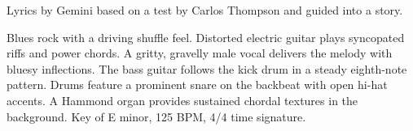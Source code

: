 

\begin{notes}
Lyrics by Gemini based on a test by Carlos Thompson and guided into a story.
\end{notes}
\begin{style}
Blues rock with a driving shuffle feel. %
Distorted electric guitar plays syncopated riffs and power chords. %
A gritty, gravelly male vocal delivers the melody with bluesy inflections. %
The bass guitar follows the kick drum in a steady eighth-note pattern. %
Drums feature a prominent snare on the backbeat with open hi-hat accents. %
A Hammond organ provides sustained chordal textures in the background. %
Key of E minor, 125 BPM, 4/4 time signature.
\end{style}
